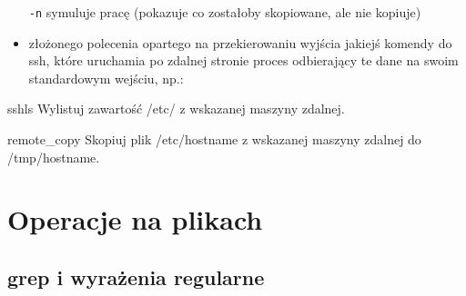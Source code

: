 \documentclass{pdfBooklets}
\begin{document}
\begin{itemize}
			\texttt{-n} symuluje pracę (pokazuje co zostałoby skopiowane, ale nie kopiuje)
	\item złożonego polecenia opartego na przekierowaniu wyjścia jakiejś komendy do ssh, które uruchamia po zdalnej stronie proces odbierający te dane na swoim standardowym wejściu, np.:
\end{itemize}

\setcounter{subsection}{0} %

\begin{Zadanie}{}{sshls}
Wylistuj zawartość /etc/ z wskazanej maszyny zdalnej.
\end{Zadanie}

\begin{Zadanie}{}{remote_copy}
Skopiuj plik /etc/hostname z wskazanej maszyny zdalnej do /tmp/hostname.
\end{Zadanie}

\section{Operacje na plikach}
\subsection{grep i wyrażenia regularne}
\end{document}
